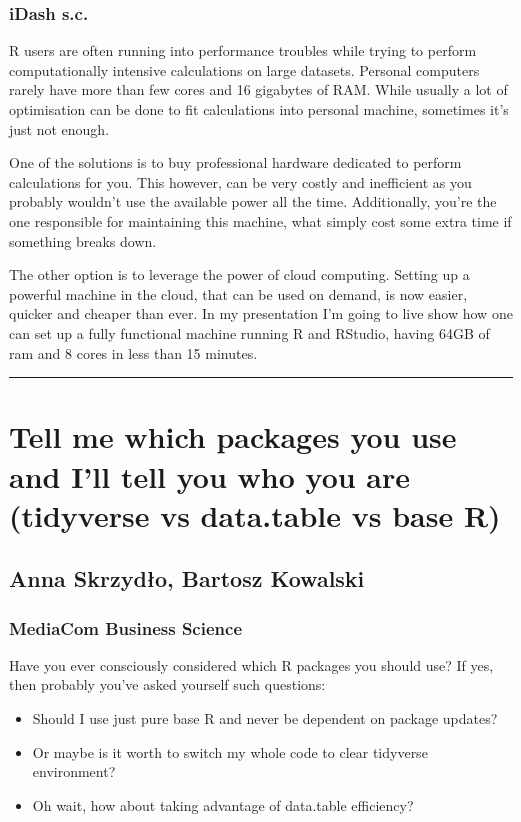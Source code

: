 \documentclass [12pt]{article}
\begin{document}
\subsubsection*{iDash s.c.}

R users are often running into performance troubles while trying to perform computationally intensive calculations on large datasets. Personal computers rarely have more than few cores and 16 gigabytes of RAM. While usually a lot of optimisation can be done to fit calculations into personal machine, sometimes it’s just not enough.

One of the solutions is to buy professional hardware dedicated to perform calculations for you. This however, can be very costly and inefficient as you probably wouldn’t use the available power all the time. Additionally, you’re the one responsible for maintaining this machine, what simply cost some extra time if something breaks down.

The other option is to leverage the power of cloud computing. Setting up a powerful machine in the cloud, that can be used on demand, is now easier, quicker and cheaper than ever. In my presentation I’m going to live show how one can set up a fully functional machine running R and RStudio, having 64GB of ram and 8 cores in less than 15 minutes.

\noindent\rule{\textwidth}{1pt}
\section{Tell me which packages you use and I’ll tell you who you are (tidyverse vs data.table vs base R)}
\subsection*{Anna	Skrzydło, Bartosz Kowalski}
\subsubsection*{MediaCom Business Science}

Have you ever consciously considered which R packages you should use? If yes, then probably you’ve asked yourself such questions:
\begin{itemize}
\setlength\itemsep{.15em}
\item Should I use just pure base R and never be dependent on package updates?
\item Or maybe is it worth to switch my whole code to clear tidyverse environment?
\item Oh wait, how about taking advantage of data.table efficiency?
\end{itemize}
\end{document}
